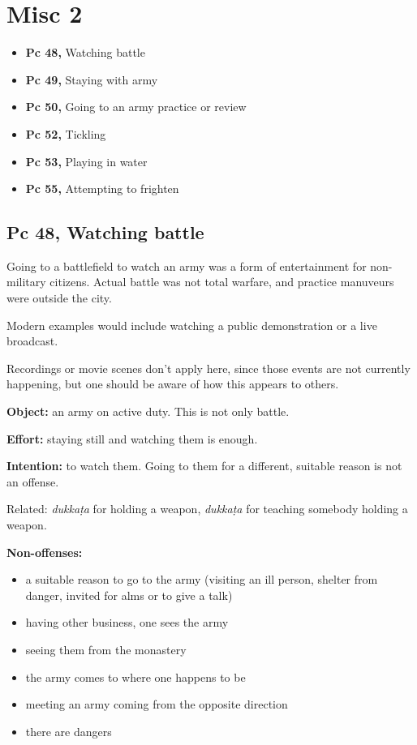 \chapter{Misc 2}

\begin{itemize}
\tightlist
\item
  \textbf{Pc 48,} Watching battle
\item
  \textbf{Pc 49,} Staying with army
\item
  \textbf{Pc 50,} Going to an army practice or review
\item
  \textbf{Pc 52,} Tickling
\item
  \textbf{Pc 53,} Playing in water
\item
  \textbf{Pc 55,} Attempting to frighten
\end{itemize}

\section{Pc 48, Watching battle}

\begin{multicols}{2}

Going to a battlefield to watch an army was a form of entertainment for
non-military citizens. Actual battle was not total warfare, and practice
manuveurs were outside the city.

Modern examples would include watching a public demonstration or a live
broadcast.

Recordings or movie scenes don't apply here, since those events are not
currently happening, but one should be aware of how this appears to
others.

\textbf{Object:} an army on active duty. This is not only battle.

\textbf{Effort:} staying still and watching them is enough.

\textbf{Intention:} to watch them. Going to them for a different,
suitable reason is not an offense.

\columnbreak

Related: \emph{dukkaṭa} for holding a weapon, \emph{dukkaṭa} for
teaching somebody holding a weapon.

\textbf{Non-offenses:}

\begin{itemize}
\tightlist
\item
  a suitable reason to go to the army (visiting an ill person, shelter
  from danger, invited for alms or to give a talk)
\item
  having other business, one sees the army
\item
  seeing them from the monastery
\item
  the army comes to where one happens to be
\item
  meeting an army coming from the opposite direction
\item
  there are dangers
\end{itemize}

\end{multicols}

